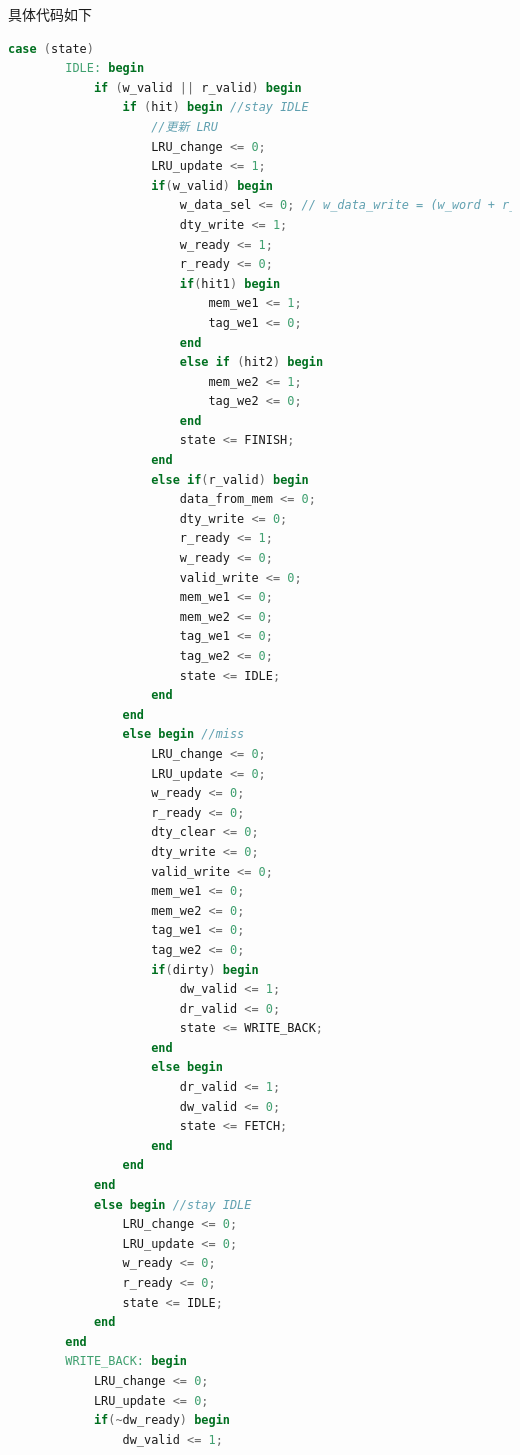 \documentclass[a4paper]{article}
\begin{document}
具体代码如下
\begin{lstlisting}[language={verilog},title={fsm.v}] 
    case (state) 
        IDLE: begin
            if (w_valid || r_valid) begin 
                if (hit) begin //stay IDLE
                    //更新 LRU
                    LRU_change <= 0;
                    LRU_update <= 1;
                    if(w_valid) begin
                        w_data_sel <= 0; // w_data_write = (w_word + r_data)
                        dty_write <= 1;
                        w_ready <= 1;
                        r_ready <= 0;
                        if(hit1) begin 
                            mem_we1 <= 1;
                            tag_we1 <= 0;
                        end
                        else if (hit2) begin 
                            mem_we2 <= 1;
                            tag_we2 <= 0;
                        end
                        state <= FINISH;
                    end
                    else if(r_valid) begin 
                        data_from_mem <= 0;
                        dty_write <= 0;
                        r_ready <= 1;
                        w_ready <= 0;
                        valid_write <= 0;
                        mem_we1 <= 0;
                        mem_we2 <= 0;
                        tag_we1 <= 0;
                        tag_we2 <= 0;
                        state <= IDLE;
                    end
                end
                else begin //miss
                    LRU_change <= 0;
                    LRU_update <= 0;
                    w_ready <= 0;
                    r_ready <= 0;
                    dty_clear <= 0;
                    dty_write <= 0;
                    valid_write <= 0;
                    mem_we1 <= 0;
                    mem_we2 <= 0;
                    tag_we1 <= 0;
                    tag_we2 <= 0;
                    if(dirty) begin
                        dw_valid <= 1;
                        dr_valid <= 0;
                        state <= WRITE_BACK;
                    end
                    else begin
                        dr_valid <= 1;
                        dw_valid <= 0;
                        state <= FETCH;
                    end
                end
            end
            else begin //stay IDLE
                LRU_change <= 0;
                LRU_update <= 0;
                w_ready <= 0;
                r_ready <= 0;
                state <= IDLE;
            end
        end
        WRITE_BACK: begin
            LRU_change <= 0;
            LRU_update <= 0;
            if(~dw_ready) begin
                dw_valid <= 1;

\end{lstlisting}
\end{document}

